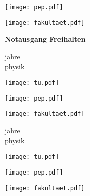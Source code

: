 \documentclass[paper=landscape]{scrartcl}
\begin{document}
\begin{minipage}{0.49\linewidth}%
  \raggedright
  \texttt{[image: pep.pdf]}%
\end{minipage}%
\begin{minipage}{0.48\linewidth}%
  \raggedleft%
  \texttt{[image: fakultaet.pdf]}%
\end{minipage}%

\vfill

\begin{center}
  \fontsize{50}{50}\selectfont\bfseries%
  Notausgang Freihalten
\end{center}

\vfill

\begin{center}
  \begin{minipage}[b]{0.20\textwidth}
    \raggedleft
        \fontsize{24}{24}\selectfont{} jahre\\[.05cm] physik
  \end{minipage}
    \begin{minipage}[b]{.5\textwidth}
    \raggedright
    \texttt{[image: tu.pdf]}
  \end{minipage}
\end{center}

\newpage

\begin{minipage}{0.49\linewidth}%
  \raggedright
  \texttt{[image: pep.pdf]}%
\end{minipage}%
\begin{minipage}{0.48\linewidth}%
  \raggedleft%
  \texttt{[image: fakultaet.pdf]}%
\end{minipage}%

\vspace{16em}

\begin{center}
  \begin{minipage}[b]{0.25\textwidth}
    \raggedleft
        \fontsize{45}{45}\selectfont{} jahre\\[.05cm] physik
  \end{minipage}
    \begin{minipage}[b]{.74\textwidth}
    \raggedright
    \texttt{[image: tu.pdf]}
  \end{minipage}
\end{center}

\newpage

\begin{minipage}{0.49\linewidth}%
  \raggedright
  \texttt{[image: pep.pdf]}%
\end{minipage}%
\begin{minipage}{0.48\linewidth}%
  \raggedleft%
  \texttt{[image: fakultaet.pdf]}%
\end{minipage}%
\end{document}

